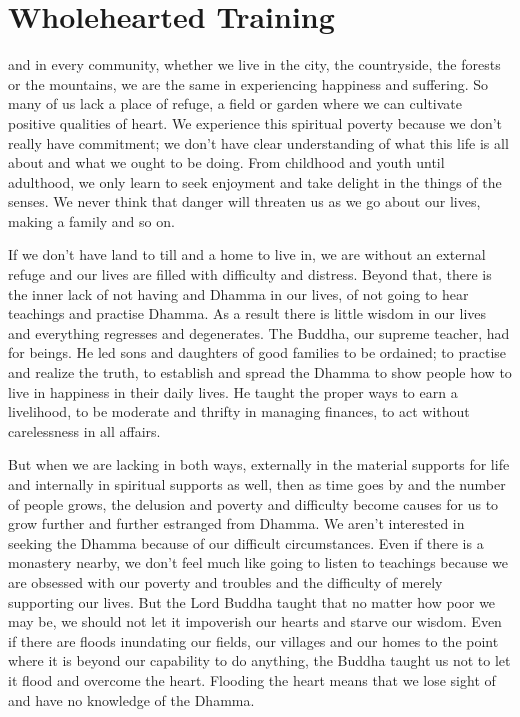 
\chapter{Wholehearted Training}

 and in every community, whether we live in the city, the countryside, the forests or the mountains, we are the same in experiencing happiness and suffering. So many of us lack a place of refuge, a field or garden where we can cultivate positive qualities of heart. We experience this spiritual poverty because we don't really have commitment; we don't have clear understanding of what this life is all about and what we ought to be doing. From childhood and youth until adulthood, we only learn to seek enjoyment and take delight in the things of the senses. We never think that danger will threaten us as we go about our lives, making a family and so on.

If we don't have land to till and a home to live in, we are without an external refuge and our lives are filled with difficulty and distress. Beyond that, there is the inner lack of not having  and Dhamma in our lives, of not going to hear teachings and practise Dhamma. As a result there is little wisdom in our lives and everything regresses and degenerates. The Buddha, our supreme teacher, had  for beings. He led sons and daughters of good families to be ordained; to practise and realize the truth, to establish and spread the Dhamma to show people how to live in happiness in their daily lives. He taught the proper ways to earn a livelihood, to be moderate and thrifty in managing finances, to act without carelessness in all affairs.

But when we are lacking in both ways, externally in the material supports for life and internally in spiritual supports as well, then as time goes by and the number of people grows, the delusion and poverty and difficulty become causes for us to grow further and further estranged from Dhamma. We aren't interested in seeking the Dhamma because of our difficult circumstances. Even if there is a monastery nearby, we don't feel much like going to listen to teachings because we are obsessed with our poverty and troubles and the difficulty of merely supporting our lives. But the Lord Buddha taught that no matter how poor we may be, we should not let it impoverish our hearts and starve our wisdom. Even if there are floods inundating our fields, our villages and our homes to the point where it is beyond our capability to do anything, the Buddha taught us not to let it flood and overcome the heart. Flooding the heart means that we lose sight of and have no knowledge of the Dhamma.

